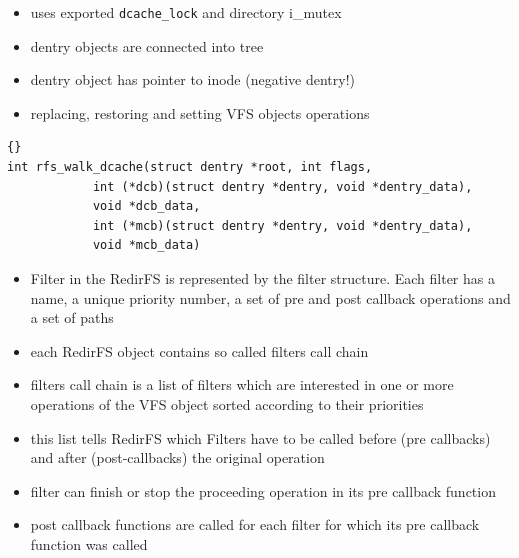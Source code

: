 \documentclass[30pt,a4paper,landscape,headrule,footrule]{foils}
\begin{document}
\begin{itemize}
\item uses exported \texttt{dcache\_lock} and directory i\_mutex
\item dentry objects are connected into tree
\item dentry object has pointer to inode (negative dentry!)
\item replacing, restoring and setting VFS objects operations
\end{itemize}

\begin{lstlisting}[frame=trbl]{}
int rfs_walk_dcache(struct dentry *root, int flags,
		    int (*dcb)(struct dentry *dentry, void *dentry_data),
		    void *dcb_data,
		    int (*mcb)(struct dentry *dentry, void *dentry_data),
		    void *mcb_data)
\end{lstlisting}

\begin{itemize}
\item Filter in the RedirFS is represented by the filter structure. Each filter has a
name, a unique priority number, a set of pre and post callback operations and a
set of paths
\end{itemize}

\begin{itemize}
\item each RedirFS object contains so called filters call chain
\item filters call chain is a list of filters which are interested in one or
more operations of the VFS object sorted according to their priorities
\item this list tells RedirFS which Filters have to be called before (pre
callbacks) and after (post-callbacks) the original operation
\end{itemize}

\begin{itemize}
\item filter can finish or stop the proceeding operation in its pre callback
function
\item post callback functions are called for each filter for which its pre
callback function was called
\end{itemize}
\end{document}
